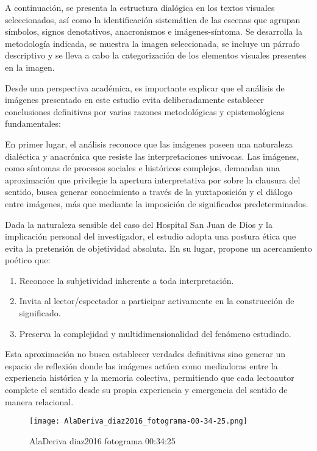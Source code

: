 A continuación, se presenta la estructura dialógica en los textos visuales seleccionados, así como la identificación sistemática de las escenas que agrupan símbolos, signos denotativos, anacronismos e imágenes-síntoma. Se desarrolla la metodología indicada, se muestra la imagen seleccionada, se incluye un párrafo descriptivo y se lleva a cabo la categorización de los elementos visuales presentes en la imagen.

Desde una perspectiva académica, es importante explicar que el análisis de imágenes presentado en este estudio evita deliberadamente establecer conclusiones definitivas por varias razones metodológicas y epistemológicas fundamentales:

En primer lugar, el análisis reconoce que las imágenes poseen una naturaleza dialéctica y anacrónica que resiste las interpretaciones unívocas. Las imágenes, como síntomas de procesos sociales e históricos complejos, demandan una aproximación que privilegie la apertura interpretativa por sobre la clausura del sentido, busca generar conocimiento a través de la yuxtaposición y el diálogo entre imágenes, más que mediante la imposición de significados predeterminados.

Dada la naturaleza sensible del caso del Hospital San Juan de Dios y la implicación personal del investigador, el estudio adopta una postura ética que evita la pretensión de objetividad absoluta. En su lugar, propone un acercamiento poético que:

\begin{enumerate}
    \item Reconoce la subjetividad inherente a toda interpretación.
    \item Invita al lector/espectador a participar activamente en la construcción de significado.
    \item Preserva la complejidad y multidimensionalidad del fenómeno estudiado.
\end{enumerate}

Esta aproximación no busca establecer verdades definitivas sino generar un espacio de reflexión donde las imágenes actúen como mediadoras entre la experiencia histórica y la memoria colectiva, permitiendo que cada lectoautor complete el sentido desde su propia experiencia y emergencia del sentido de manera relacional.


\clearpage
\begin{figure}[h!]
    \centering
    \texttt{[image: AlaDeriva\_diaz2016\_fotograma-00-34-25.png]}
    \caption{AlaDeriva diaz2016 fotograma 00:34:25}
    \label{fig:AlaDeriva_diaz2016_fotograma_00_34_25}
\end{figure}

